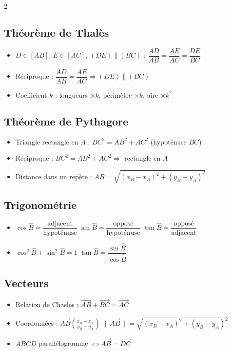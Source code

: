 \begin{multicols}{2}
\subsection*{\color{onbo}Théorème de Thalès}
\begin{itemize}
\item $D\in[AB]$, $E\in[AC]$, $(DE)\parallel(BC)$ : $\dfrac{AD}{AB}=\dfrac{AE}{AC}=\dfrac{DE}{BC}$
\item Réciproque : $\dfrac{AD}{AB}=\dfrac{AE}{AC}\Rightarrow(DE)\parallel(BC)$
\item Coefficient $k$ : longueurs $\times k$, périmètre $\times k$, aire $\times k^{2}$
\end{itemize}

\subsection*{\color{onbo}Théorème de Pythagore}
\begin{itemize}
\item Triangle rectangle en $A$ : $BC^{2}=AB^{2}+AC^{2}$ (hypoténuse $BC$)
\item Réciproque : $BC^{2}=AB^{2}+AC^{2}\Rightarrow$ rectangle en $A$
\item Distance dans un repère : $AB=\sqrt{(x_B-x_A)^{2}+(y_B-y_A)^{2}}$
\end{itemize}

\subsection*{\color{onbo}Trigonométrie}
\begin{itemize}
\item $\cos\widehat B=\dfrac{\text{adjacent}}{\text{hypoténuse}}$ \quad
$\sin\widehat B=\dfrac{\text{opposé}}{\text{hypoténuse}}$ \quad
$\tan\widehat B=\dfrac{\text{opposé}}{\text{adjacent}}$
\item $\cos^{2}\widehat B+\sin^{2}\widehat B=1$ \quad
$\tan\widehat B=\dfrac{\sin\widehat B}{\cos\widehat B}$
\end{itemize}

\subsection*{\color{onbo}Vecteurs}
\begin{itemize}
\item Relation de Chasles : $\vec{AB}+\vec{BC}=\vec{AC}$
\item Coordonnées : $\vec{AB}\binom{x_B-x_A}{y_B-y_A}$ \quad
$\|\vec{AB}\|=\sqrt{(x_B-x_A)^{2}+(y_B-y_A)^{2}}$
\item $ABCD$ parallélogramme $\iff\vec{AB}=\vec{DC}$
\end{itemize}


\end{multicols}
